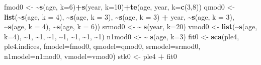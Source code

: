 \documentclass[
]{book}
\newenvironment{Shaded}{\begin{snugshade}}{\end{snugshade}}
\newcommand{\AttributeTok}[1]{\textcolor[rgb]{0.13,0.29,0.53}{#1}}
\newcommand{\DecValTok}[1]{\textcolor[rgb]{0.00,0.00,0.81}{#1}}
\newcommand{\ErrorTok}[1]{\textcolor[rgb]{0.64,0.00,0.00}{\textbf{#1}}}
\newcommand{\FunctionTok}[1]{\textcolor[rgb]{0.13,0.29,0.53}{\textbf{#1}}}
\newcommand{\NormalTok}[1]{#1}
\newcommand{\OtherTok}[1]{\textcolor[rgb]{0.56,0.35,0.01}{#1}}
\newcommand{\SpecialCharTok}[1]{\textcolor[rgb]{0.81,0.36,0.00}{\textbf{#1}}}
\begin{document}
\begin{Shaded}
\begin{Highlighting}[]
\NormalTok{fmod0 }\OtherTok{\textless{}{-}} \ErrorTok{\textasciitilde{}}\FunctionTok{s}\NormalTok{(age, }\AttributeTok{k=}\DecValTok{6}\NormalTok{)}\SpecialCharTok{+}\FunctionTok{s}\NormalTok{(year, }\AttributeTok{k=}\DecValTok{10}\NormalTok{)}\SpecialCharTok{+}\FunctionTok{te}\NormalTok{(age, year, }\AttributeTok{k=}\FunctionTok{c}\NormalTok{(}\DecValTok{3}\NormalTok{,}\DecValTok{8}\NormalTok{))}
\NormalTok{qmod0 }\OtherTok{\textless{}{-}} \FunctionTok{list}\NormalTok{(}\SpecialCharTok{\textasciitilde{}}\FunctionTok{s}\NormalTok{(age, }\AttributeTok{k =} \DecValTok{4}\NormalTok{),}
       \SpecialCharTok{\textasciitilde{}}\FunctionTok{s}\NormalTok{(age, }\AttributeTok{k =} \DecValTok{3}\NormalTok{),}
       \SpecialCharTok{\textasciitilde{}}\FunctionTok{s}\NormalTok{(age, }\AttributeTok{k =} \DecValTok{3}\NormalTok{) }\SpecialCharTok{+}\NormalTok{ year,}
       \SpecialCharTok{\textasciitilde{}}\FunctionTok{s}\NormalTok{(age, }\AttributeTok{k =} \DecValTok{3}\NormalTok{),}
       \SpecialCharTok{\textasciitilde{}}\FunctionTok{s}\NormalTok{(age, }\AttributeTok{k =} \DecValTok{4}\NormalTok{),}
       \SpecialCharTok{\textasciitilde{}}\FunctionTok{s}\NormalTok{(age, }\AttributeTok{k =} \DecValTok{6}\NormalTok{))}
\NormalTok{srmod0 }\OtherTok{\textless{}{-}} \ErrorTok{\textasciitilde{}} \FunctionTok{s}\NormalTok{(year, }\AttributeTok{k=}\DecValTok{20}\NormalTok{)}
\NormalTok{vmod0 }\OtherTok{\textless{}{-}} \FunctionTok{list}\NormalTok{(}\SpecialCharTok{\textasciitilde{}}\FunctionTok{s}\NormalTok{(age, }\AttributeTok{k=}\DecValTok{4}\NormalTok{), }\SpecialCharTok{\textasciitilde{}}\DecValTok{1}\NormalTok{,  }\SpecialCharTok{\textasciitilde{}}\DecValTok{1}\NormalTok{, }\SpecialCharTok{\textasciitilde{}}\DecValTok{1}\NormalTok{, }\SpecialCharTok{\textasciitilde{}}\DecValTok{1}\NormalTok{, }\SpecialCharTok{\textasciitilde{}}\DecValTok{1}\NormalTok{, }\SpecialCharTok{\textasciitilde{}}\DecValTok{1}\NormalTok{, }\SpecialCharTok{\textasciitilde{}}\DecValTok{1}\NormalTok{)}
\NormalTok{n1mod0 }\OtherTok{\textless{}{-}} \ErrorTok{\textasciitilde{}} \FunctionTok{s}\NormalTok{(age, }\AttributeTok{k=}\DecValTok{3}\NormalTok{)}
\NormalTok{fit0 }\OtherTok{\textless{}{-}} \FunctionTok{sca}\NormalTok{(ple4, ple4.indices,}
       \AttributeTok{fmodel=}\NormalTok{fmod0,}
       \AttributeTok{qmodel=}\NormalTok{qmod0,}
       \AttributeTok{srmodel=}\NormalTok{srmod0,}
       \AttributeTok{n1model=}\NormalTok{n1mod0,}
       \AttributeTok{vmodel=}\NormalTok{vmod0)}
\NormalTok{stk0 }\OtherTok{\textless{}{-}}\NormalTok{ ple4 }\SpecialCharTok{+}\NormalTok{ fit0}
\end{Highlighting}
\end{Shaded}
\end{document}
